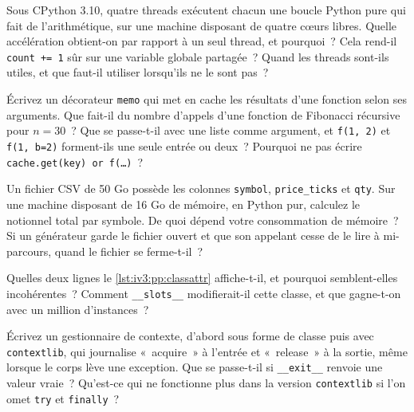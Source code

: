 \begin{question}\label{iq:iv3:python-and-pandas:10}
Sous CPython 3.10, quatre threads exécutent chacun une boucle Python pure qui fait de l'arithmétique, sur une machine disposant de quatre cœurs libres. Quelle accélération obtient-on par rapport à un seul thread, et pourquoi~? Cela rend-il \texttt{count += 1} sûr sur une variable globale partagée~? Quand les threads sont-ils utiles, et que faut-il utiliser lorsqu'ils ne le sont pas~?
\end{question}

\begin{question}\label{iq:iv3:python-and-pandas:11}
Écrivez un décorateur \texttt{memo} qui met en cache les résultats d'une fonction selon ses arguments. Que fait-il du nombre d'appels d'une fonction de Fibonacci récursive pour $n = 30$~? Que se passe-t-il avec une liste comme argument, et \texttt{f(1, 2)} et \texttt{f(1, b=2)} forment-ils une seule entrée ou deux~? Pourquoi ne pas écrire \texttt{cache.get(key) or f(\dots)}~?
\end{question}

\begin{question}\label{iq:iv3:python-and-pandas:12}
Un fichier CSV de 50 Go possède les colonnes \texttt{symbol}, \texttt{price\_ticks} et \texttt{qty}. Sur une machine disposant de 16 Go de mémoire, en Python pur, calculez le notionnel total par symbole. De quoi dépend votre consommation de mémoire~? Si un générateur garde le fichier ouvert et que son appelant cesse de le lire à mi-parcours, quand le fichier se ferme-t-il~?
\end{question}

\begin{question}\label{iq:iv3:python-and-pandas:13}
Quelles deux lignes le \cref{lst:iv3:pp:classattr} affiche-t-il, et pourquoi semblent-elles incohérentes~? Comment \texttt{\_\_slots\_\_} modifierait-il cette classe, et que gagne-t-on avec un million d'instances~?
\label{lst:iv3:pp:classattr}
\end{question}

\begin{question}\label{iq:iv3:python-and-pandas:14}
Écrivez un gestionnaire de contexte, d'abord sous forme de classe puis avec \texttt{contextlib}, qui journalise «~acquire~» à l'entrée et «~release~» à la sortie, même lorsque le corps lève une exception. Que se passe-t-il si \texttt{\_\_exit\_\_} renvoie une valeur vraie~? Qu'est-ce qui ne fonctionne plus dans la version \texttt{contextlib} si l'on omet \texttt{try} et \texttt{finally}~?
\end{question}


